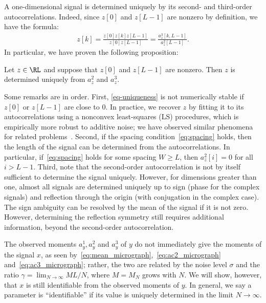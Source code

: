 \documentclass[9pt,twocolumn,twoside,lineno]{pnas-new}
\begin{document}
A one-dimensional signal is determined uniquely by its second- and third-order autocorrelations. Indeed, since $z[0]$ and $z[L-1]$ are nonzero by definition, we have the formula:
%
\begin{align} \label{eq-uniqueness}
%
z[k] = \frac{z[0]z[k]z[L-1]}{z[0]z[L-1]} = \frac{a_z^3[k,L-1]}{a_z^2[L-1]}.
%
\end{align}
In particular, we have proven the following proposition:
\begin{proposition} \label{prop:uniqueness}
	Let $z\in\RL$ and suppose that $z[0]$ and $z[L-1]$ are nonzero. Then $z$ is determined uniquely from  $a_z^2$ and $a_z^3$.
\end{proposition}

Some remarks are in order. First, \eqref{eq-uniqueness} is not numerically stable if $z[0]$ or $z[L-1]$ are close to 0. In practice, we recover $z$ by fitting it to its autocorrelations using a nonconvex least-squares (LS) procedures, which is empirically more robust to additive noise; we have observed similar phenomena for related problems~\cite{bendory2017bispectrum,boumal2017heterogeneous,abbe2017multireference}.
Second, if the spacing condition~\eqref{eq:spacing} holds, then the length of the signal can be determined from the autocorrelations.
In particular, if~\eqref{eq:spacing} holds for some spacing $W\geq L$, then $a_z^2[i]=0$ for all $i>L-1$.
Third, note that the second-order autocorrelation is not by itself sufficient to determine the signal uniquely. %
However, for dimensions greater than one, almost all signals are determined uniquely up to sign (phase for the complex signals) and reflection through the origin (with conjugation in the complex case). %
The sign ambiguity can be resolved by the mean of the signal if it is not zero. However, determining the reflection symmetry still requires additional information, beyond the second-order autocorrelation.

The observed moments $a_y^1,a_y^2$ and $a_y^3$ of $y$ do not immediately give the moments of the signal $x$, as seen by~\eqref{eq:mean_micrograph},~\eqref{eq:ac2_micrograph} and~\eqref{eq:ac3_micrograph}; rather, the two are related by the noise level $\sigma$ and the ratio $\gamma = \lim_{N\to\infty}ML/N$, where $M=M_N$ grows with $N$. We will show, however, that $x$ is still identifiable from the observed moments of $y$. In general, we say a parameter is ``identifiable'' if its value is uniquely determined in the limit $N \to \infty$.
\end{document}

